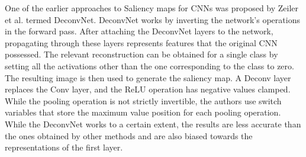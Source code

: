 







One of the earlier approaches to Saliency maps for CNNs was proposed by Zeiler et al. \cite{zeilerVisualizingUnderstandingConvolutional2013} termed DeconvNet. DeconvNet works by inverting the network's operations in the forward pass. After attaching the DeconvNet layers to the network, propagating through these layers represents features that the original CNN possessed. The relevant reconstruction can be obtained for a single class by setting all the activations other than the one corresponding to the class to zero. The resulting image is then used to generate the saliency map. A Deconv layer replaces the Conv layer, and the ReLU operation has negative values clamped. While the pooling operation is not strictly invertible, the authors use switch variables that store the maximum value position for each pooling operation. While the DeconvNet works to a certain extent, the results are less accurate than the ones obtained by other methods and are also biased towards the representations of the first layer.


